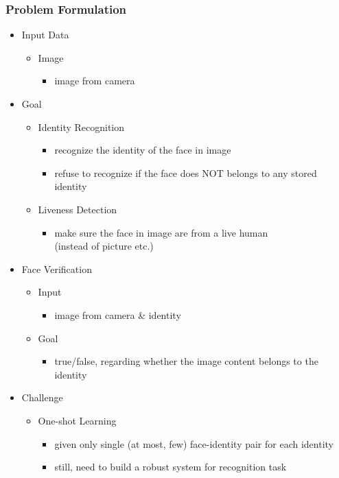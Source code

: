 \subsubsection{Problem Formulation}
\begin{itemize}
\item Input Data
	\begin{itemize}
	\item Image 
		\begin{itemize}
		\item image from camera
		\end{itemize}
	\end{itemize}
\item Goal
	\begin{itemize}
	\item Identity Recognition
		\begin{itemize}
		\item recognize the identity of the face in image
		\item refuse to recognize if the face does NOT belongs to any stored identity
		\end{itemize}
	\item Liveness Detection
		\begin{itemize}
		\item make sure the face in image are from a live human \\
		(instead of picture etc.)
		\end{itemize}
	\end{itemize}
\item Face Verification
	\begin{itemize}
	\item Input
		\begin{itemize}
		\item image from camera \& identity
		\end{itemize}
	\item Goal
		\begin{itemize}
		\item true/false, regarding whether the image content belongs to the identity
		\end{itemize}
	\end{itemize}
	
\item Challenge
	\begin{itemize}
	\item One-shot Learning
		\begin{itemize}
		\item given only single (at most, few) face-identity pair for each identity
		\item still, need to build a robust system for recognition task
		\end{itemize}
	\end{itemize}
\end{itemize}

